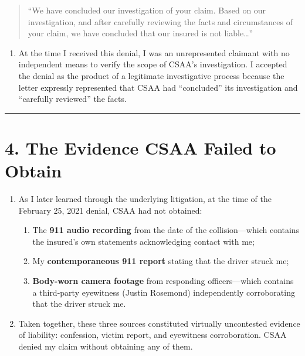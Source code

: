 \begin{quote}
``We have concluded our investigation of your claim. Based on our investigation, and after carefully reviewing the facts and circumstances of your claim, we have concluded that our insured is not liable\ldots{}''
\end{quote}

\begin{enumerate}
\def\labelenumi{\arabic{enumi}.}
\setcounter{enumi}{7}
\tightlist
\item
  At the time I received this denial, I was an unrepresented claimant with no independent means to verify the scope of CSAA's investigation. I accepted the denial as the product of a legitimate investigative process because the letter expressly represented that CSAA had ``concluded'' its investigation and ``carefully reviewed'' the facts.
\end{enumerate}

\begin{center}\rule{0.5\linewidth}{0.5pt}\end{center}

\section{4. The Evidence CSAA Failed to Obtain}\label{the-evidence-csaa-failed-to-obtain}

\begin{enumerate}
\def\labelenumi{\arabic{enumi}.}
\setcounter{enumi}{8}
\item
  As I later learned through the underlying litigation, at the time of the February 25, 2021 denial, CSAA had not obtained:

  \begin{enumerate}
  \def\labelenumii{(\alph{enumii})}
  \item
    The \textbf{911 audio recording} from the date of the collision---which contains the insured's own statements acknowledging contact with me;
  \item
    My \textbf{contemporaneous 911 report} stating that the driver struck me;
  \item
    \textbf{Body-worn camera footage} from responding officers---which contains a third-party eyewitness (Justin Rosemond) independently corroborating that the driver struck me.
  \end{enumerate}
\item
  Taken together, these three sources constituted virtually uncontested evidence of liability: confession, victim report, and eyewitness corroboration. CSAA denied my claim without obtaining any of them.
\end{enumerate}

